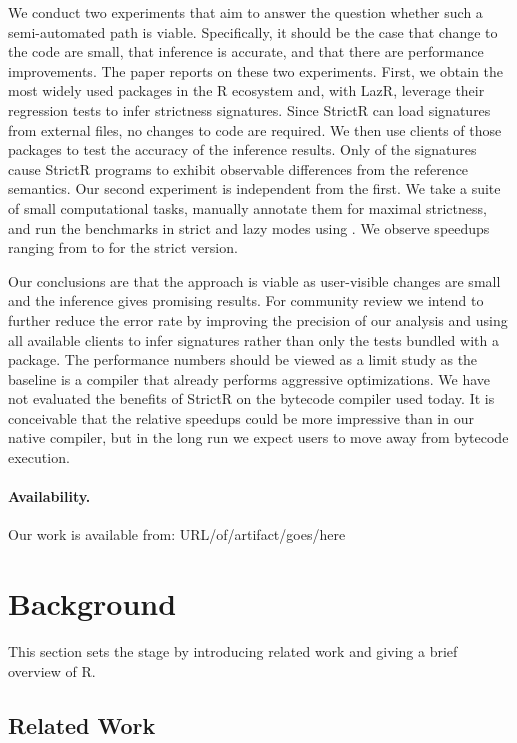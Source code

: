 \documentclass[review,creen,acmsmall]{acmart}
\newcommand{\strictr}{{\sf StrictR}\xspace}
\newcommand{\lazr}{{\sf LazR}\xspace}
\begin{document}
We conduct two experiments that aim to answer the question whether such a
semi-automated path is viable. Specifically, it should be the case that change
to the code are small, that inference is accurate, and that there are
performance improvements. The paper reports on these two experiments. First, we
obtain the most widely used packages in the R ecosystem and, with \lazr,
leverage their regression tests to infer strictness signatures. Since \strictr
can load signatures from external files, no changes to code are required. We
then use clients of those packages to test the accuracy of the inference
results. Only \robustnesResult of the signatures cause \strictr programs to
exhibit observable differences from the reference semantics. Our second
experiment is independent from the first. We take a suite of small computational
tasks, manually annotate them for maximal strictness, and run the benchmarks in
strict and lazy modes using \rshstrict. We observe speedups ranging from
\speedupRshStrictMin to \speedupRshStrictMax for the strict version.

Our conclusions are that the approach is viable as user-visible changes are
small and the inference gives promising results. For community review we intend
to further reduce the error rate by improving the precision of our analysis and
using all available clients to infer signatures rather than only the tests
bundled with a package. The performance numbers should be viewed as a limit
study as the baseline is a compiler that already performs aggressive
optimizations. We have not evaluated the benefits of \strictr on the bytecode
compiler used today. It is conceivable that the relative speedups could be more
impressive than in our native compiler, but in the long run we expect users
to move away from bytecode execution.

\paragraph{Availability.} Our work is available from:
    URL/of/artifact/goes/here

\section{Background}\label{sec:background}

This section sets the stage by introducing related work and giving a brief
overview of R.

\subsection{Related Work}
\end{document}
